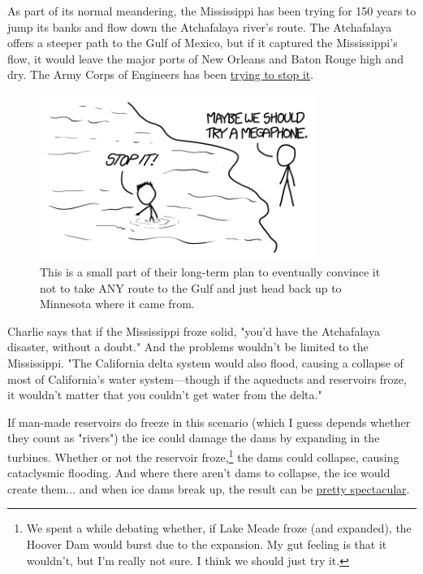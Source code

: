 {{As part of its normal meandering, the Mississippi has been trying for 150 years to jump its banks and flow down the Atchafalaya river's route. The Atchafalaya offers a steeper path to the Gulf of Mexico, but if it captured the Mississippi's flow, it would leave the major ports of New Orleans and Baton Rouge high and dry. The Army Corps of Engineers has been \href{http://www.americaswetlandresources.com/background\_facts/detailedstory/LouisianaRiverControl.html}{trying to stop it}.}

\begin{figure}[!htbp]
\centering
\includegraphics[scale=0.5, max width=0.8\textwidth]{imgs/a/121/acoe.png}
\caption{This is a small part of their long-term plan to eventually convince it not to take ANY route to the Gulf and just head back up to Minnesota where it came from.}
\end{figure}

{Charlie says that if the Mississippi froze solid, "you'd have the Atchafalaya disaster, without a doubt." And the problems wouldn't be limited to the Mississippi. "The California delta system would also flood, causing a collapse of most of California's water system—though if the aqueducts and reservoirs froze, it wouldn't matter that you couldn't get water from the delta."}

{If man-made reservoirs do freeze in this scenario (which I guess depends whether they count as "rivers") the ice could damage the dams by expanding in the turbines. Whether or not the reservoir froze,{\footnote{We spent a while debating whether, if Lake Meade froze (and expanded), the Hoover Dam would burst due to the expansion. My gut feeling is that it wouldn't, but I'm really not sure. I think we should just try it.} } the dams could collapse, causing cataclysmic flooding. And where there aren't dams to collapse, the ice would create them... and when ice dams break up, the result can be \href{https://www.youtube.com/watch?v=ezcgPAptbIk}{pretty spectacular}.}

}
